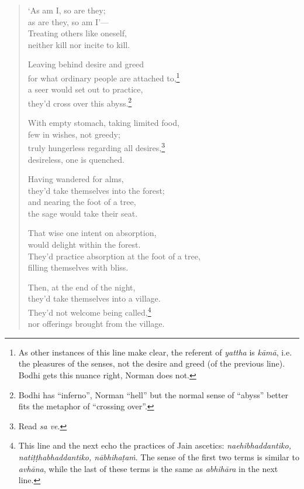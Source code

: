 \documentclass[12pt,openany]{book}%
\begin{document}
\begin{verse}
‘As am I, so are they; \\
as are they, so am I’—\\
Treating others like oneself, \\
neither kill nor incite to kill. 

Leaving behind desire and greed \\
for what ordinary people are attached to,\footnote{As other instances of this line make clear, the referent of \textit{yattha} is \textit{\textsanskrit{kāmā}}, i.e. the pleasures of the senses, not the desire and greed (of the previous line). Bodhi gets this nuance right, Norman does not. } \\
a seer would set out to practice, \\
they’d cross over this abyss.\footnote{Bodhi has “inferno”, Norman “hell” but the normal sense of “abyss” better fits the metaphor of “crossing over”. } 

With empty stomach, taking limited food, \\
few in wishes, not greedy; \\
truly hungerless regarding all desires,\footnote{Read \textit{sa ve}. } \\
desireless, one is quenched. 

Having wandered for alms, \\
they’d take themselves into the forest; \\
and nearing the foot of a tree, \\
the sage would take their seat. 

That wise one intent on absorption, \\
would delight within the forest. \\
They’d practice absorption at the foot of a tree, \\
filling themselves with bliss. 

Then, at the end of the night, \\
they’d take themselves into a village. \\
They’d not welcome being called,\footnote{This line and the next echo the practices of Jain ascetics: \textit{naehibhaddantiko, \textsanskrit{natiṭṭhabhaddantiko}, \textsanskrit{nābhihaṭaṁ}}. The sense of the first two terms is similar to \textit{\textsanskrit{avhāna}}, while the last of these terms is the same as \textit{\textsanskrit{abhihāra}} in the next line. } \\
nor offerings brought from the village. 


\end{verse}
\end{document}
